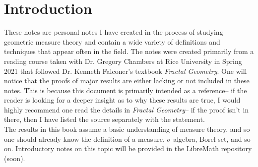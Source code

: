 \documentclass{memoir}
\begin{document}


\chapter{Introduction}
\label{cha:introduction}

These notes are personal notes I have created in the process of studying geometric measure theory and contain a wide variety of definitions and techniques that appear often in the field. The notes were created primarily from a reading course taken with Dr. Gregory Chambers at Rice University in Spring 2021 that followed Dr. Kenneth Falconer's textbook \textit{Fractal Geometry}. One will notice that the proofs of major results are either lacking or not included in these notes. This is because this document is primarily intended as a reference-- if the reader is looking for a deeper insight as to why these results are true, I would highly recommend one read the details in \textit{Fractal Geometry}-- if the proof isn't in there, then I have listed the source separately with the statement.\\

The results in this book assume a basic understanding of measure theory, and so one should already know the definition of a measure, \(\sigma \)-algebra, Borel set, and so on. Introductory notes on this topic will be provided in the LibreMath repository (soon).
\end{document}
